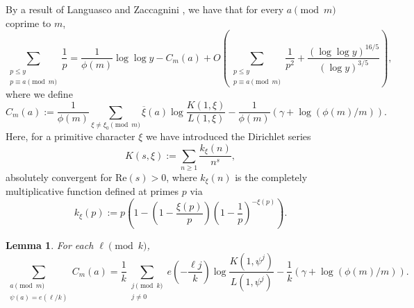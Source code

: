 \documentclass[10pt]{amsart}
\newtheorem{lem}[thm]{Lemma}
\theoremstyle{definition}
\renewcommand{\ss}{\substack}
\renewcommand{\bar}{\overline}
\begin{document}
By a result of Languasco and Zaccagnini \cite[Thm. 2, Cor. 3]{LanZac}, we have that for every $a \pmod{m}$ coprime to $m$,
\begin{equation} \label{eq:LangZac}
\sum_{\ss{p \leq y \\ p \equiv a \pmod{m}}} \frac{1}{p} = \frac{1}{\phi(m)} \log\log y - C_m(a) + O\left(\sum_{\ss{p \leq y \\ p \equiv a \pmod{m}}} \frac{1}{p^2} + \frac{(\log\log y)^{16/5}}{(\log y)^{3/5}}\right),
\end{equation}
where we define
\begin{equation}\label{eq:CmaDef}
C_m(a) := \frac{1}{\phi(m)} \sum_{\xi \neq \xi_0 \pmod{m}} \bar{\xi}(a) \log \frac{K(1,\xi)}{L(1,\xi)} - \frac{1}{\phi(m)}(\gamma + \log(\phi(m)/m)).
\end{equation}
Here, for a primitive character $\xi$ we have introduced the Dirichlet series 
$$
K(s,\xi) := \sum_{n \geq 1} \frac{k_{\xi}(n)}{n^s},
$$
absolutely convergent for $\text{Re}(s) > 0$, where $k_{\xi}(n)$ is the completely multiplicative function defined at primes $p$ via
\begin{equation}\label{eq:kxiDef}
k_{\xi}(p) := p\left(1-\left(1-\frac{\xi(p)}{p}\right)\left(1-\frac{1}{p}\right)^{-\xi(p)}\right).
\end{equation}
\begin{lem} \label{lem:CmaFixl}
For each $\ell \pmod{k}$,
$$
\sum_{\ss{a \pmod{m} \\ \psi(a) = e(\ell/k)}} C_m(a) = \frac{1}{k} \sum_{\ss{j \pmod{k} \\ j \neq 0}} e\left(-\frac{\ell j }{k}\right) \log \frac{K(1,\psi^j)}{L(1,\psi^j)} - \frac{1}{k} \left(\gamma + \log(\phi(m)/m)\right).
$$
\end{lem}
\end{document}
